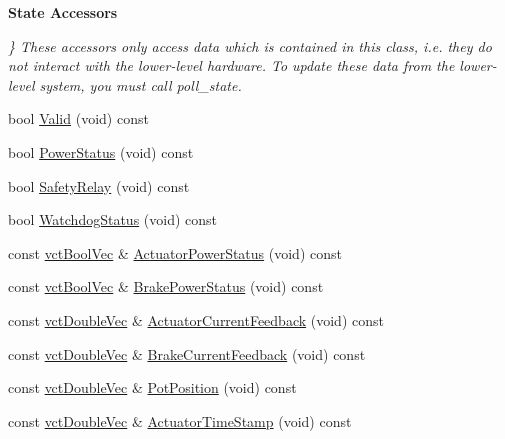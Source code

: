 \begin{Indent}{\bf State Accessors}\par
{\em \} These accessors only access data which is contained in this class, i.\-e. they do not interact with the lower-\/level hardware. To update these data from the lower-\/level system, you must call poll\-\_\-state. }\begin{DoxyCompactItemize}
\item 
bool \hyperlink{classsaw_robot_i_o1394_1_1osa_robot1394_a0717e94a561fb7dff6f438cb8be3858f}{Valid} (void) const 
\item 
bool \hyperlink{classsaw_robot_i_o1394_1_1osa_robot1394_a27fbb2ba67d54d480873273d3912ca1c}{Power\-Status} (void) const 
\item 
bool \hyperlink{classsaw_robot_i_o1394_1_1osa_robot1394_aaaaaff30d724104f33813430ee391ceb}{Safety\-Relay} (void) const 
\item 
bool \hyperlink{classsaw_robot_i_o1394_1_1osa_robot1394_a375eafa1dcc5e6e022472b1a435a8de9}{Watchdog\-Status} (void) const 
\item 
const \hyperlink{vct_dynamic_vector_types_8h_aeb2237c134aee3769198bd9d55c8a9e0}{vct\-Bool\-Vec} \& \hyperlink{classsaw_robot_i_o1394_1_1osa_robot1394_a1eda6e2132f4a0127a77273d8df6d0ea}{Actuator\-Power\-Status} (void) const 
\item 
const \hyperlink{vct_dynamic_vector_types_8h_aeb2237c134aee3769198bd9d55c8a9e0}{vct\-Bool\-Vec} \& \hyperlink{classsaw_robot_i_o1394_1_1osa_robot1394_a9f396a55f74ca6105d10f315052c052a}{Brake\-Power\-Status} (void) const 
\item 
const \hyperlink{vct_dynamic_vector_types_8h_ade4b3068c86fb88f41af2e5187e491c2}{vct\-Double\-Vec} \& \hyperlink{classsaw_robot_i_o1394_1_1osa_robot1394_aa2b1e24f66bb30181d61001fa6b04836}{Actuator\-Current\-Feedback} (void) const 
\item 
const \hyperlink{vct_dynamic_vector_types_8h_ade4b3068c86fb88f41af2e5187e491c2}{vct\-Double\-Vec} \& \hyperlink{classsaw_robot_i_o1394_1_1osa_robot1394_a56bdc8fda6bbe0e26d3ba273d522b0d6}{Brake\-Current\-Feedback} (void) const 
\item 
const \hyperlink{vct_dynamic_vector_types_8h_ade4b3068c86fb88f41af2e5187e491c2}{vct\-Double\-Vec} \& \hyperlink{classsaw_robot_i_o1394_1_1osa_robot1394_aee6e3eb5964265bf0f6224c81649c213}{Pot\-Position} (void) const 
\item 
const \hyperlink{vct_dynamic_vector_types_8h_ade4b3068c86fb88f41af2e5187e491c2}{vct\-Double\-Vec} \& \hyperlink{classsaw_robot_i_o1394_1_1osa_robot1394_add104f977b5a360fe8bda14f2e94f82a}{Actuator\-Time\-Stamp} (void) const 

\end{DoxyCompactItemize}
\end{Indent}
